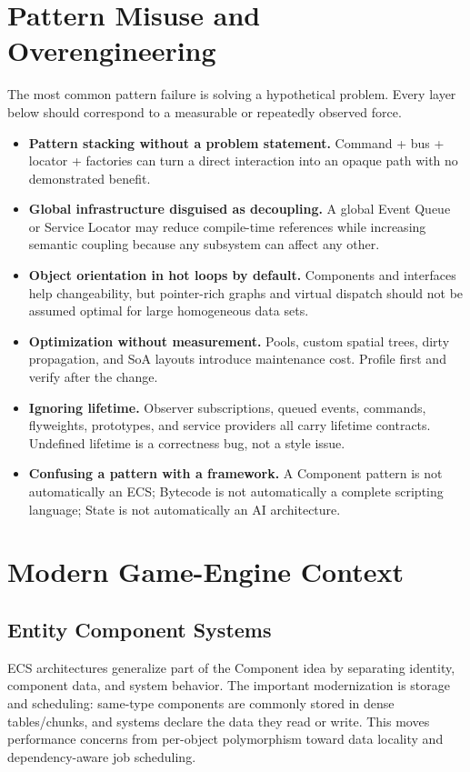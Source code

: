 \documentclass[11pt]{article}
\begin{document}
\section{Pattern Misuse and Overengineering}\label{sec:misuse}
\begin{warningbox}
The most common pattern failure is solving a hypothetical problem. Every layer below should correspond to a measurable or repeatedly observed force.
\end{warningbox}
\begin{itemize}
\item \textbf{Pattern stacking without a problem statement.} Command + bus + locator + factories can turn a direct interaction into an opaque path with no demonstrated benefit.
\item \textbf{Global infrastructure disguised as decoupling.} A global Event Queue or Service Locator may reduce compile-time references while increasing semantic coupling because any subsystem can affect any other.
\item \textbf{Object orientation in hot loops by default.} Components and interfaces help changeability, but pointer-rich graphs and virtual dispatch should not be assumed optimal for large homogeneous data sets.
\item \textbf{Optimization without measurement.} Pools, custom spatial trees, dirty propagation, and SoA layouts introduce maintenance cost. Profile first and verify after the change.
\item \textbf{Ignoring lifetime.} Observer subscriptions, queued events, commands, flyweights, prototypes, and service providers all carry lifetime contracts. Undefined lifetime is a correctness bug, not a style issue.
\item \textbf{Confusing a pattern with a framework.} A Component pattern is not automatically an ECS; Bytecode is not automatically a complete scripting language; State is not automatically an AI architecture.
\end{itemize}

\section{Modern Game-Engine Context}\label{sec:modern-context}
\subsection{Entity Component Systems}
ECS architectures generalize part of the Component idea by separating identity, component data, and system behavior. The important modernization is storage and scheduling: same-type components are commonly stored in dense tables/chunks, and systems declare the data they read or write. This moves performance concerns from per-object polymorphism toward data locality and dependency-aware job scheduling.
\end{document}
